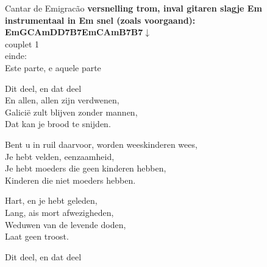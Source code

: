 \begin{song}[fado]{Cantar de Emigracão}
\textbf{versnelling trom, inval gitaren slagje Em}\\
\textbf{instrumentaal in Em snel (zoals voorgaand):\\Em\phantom{xxx}G\phantom{xxx}C\phantom{xi}Am\phantom{xi}D\phantom{xxx}D7\phantom{xi}B7\phantom{xi}Em\phantom{xxx}C\phantom{xi}Am\phantom{xi}B7\phantom{xi}B7$\downarrow$}\\
	couplet 1\\
	einde:\\
	Este parte, e aquele parte
\end{song}

\clearpage
\begin{translation}
Dit deel, en dat deel\\
En allen, allen zijn verdwenen,\\
Galicië zult blijven zonder mannen,\\
Dat kan je brood te snijden.\vspace{\wlskip}

Bent u in ruil daarvoor, worden weeskinderen wees,\\
Je hebt velden, eenzaamheid,\\
Je hebt moeders die geen kinderen hebben,\\
Kinderen die niet moeders hebben.\vspace{\wlskip}

Hart, en je hebt geleden,\\
Lang, ais mort afwezigheden,\\
Weduwen van de levende doden,\\
Laat geen troost.\vspace{\wlskip}

Dit deel, en dat deel
\end{translation}
